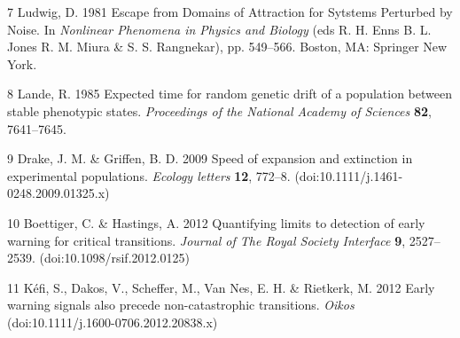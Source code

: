 \documentclass[review]{elsarticle} %
\begin{document}
7 Ludwig, D. 1981 Escape from Domains of Attraction for Sytstems
Perturbed by Noise. In \emph{Nonlinear Phenomena in Physics and Biology}
(eds R. H. Enns B. L. Jones R. M. Miura \& S. S. Rangnekar), pp.
549--566. Boston, MA: Springer New York.

8 Lande, R. 1985 Expected time for random genetic drift of a population
between stable phenotypic states. \emph{Proceedings of the National
Academy of Sciences} \textbf{82}, 7641--7645.

9 Drake, J. M. \& Griffen, B. D. 2009 Speed of expansion and extinction
in experimental populations. \emph{Ecology letters} \textbf{12}, 772--8.
(doi:10.1111/j.1461-0248.2009.01325.x)

10 Boettiger, C. \& Hastings, A. 2012 Quantifying limits to detection of
early warning for critical transitions. \emph{Journal of The Royal
Society Interface} \textbf{9}, 2527--2539. (doi:10.1098/rsif.2012.0125)

11 Kéfi, S., Dakos, V., Scheffer, M., Van Nes, E. H. \& Rietkerk, M.
2012 Early warning signals also precede non-catastrophic transitions.
\emph{Oikos} (doi:10.1111/j.1600-0706.2012.20838.x)
\end{document}
